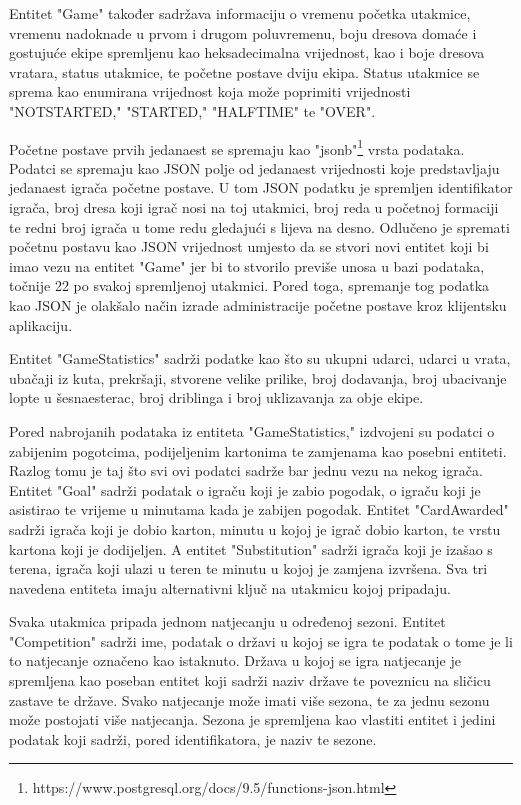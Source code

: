 \documentclass[times, utf8, zavrsni]{fer}
\begin{document}
%
Entitet "Game" također sadržava informaciju o vremenu početka utakmice, vremenu nadoknade u prvom i drugom poluvremenu, boju dresova domaće i gostujuće ekipe spremljenu kao heksadecimalna vrijednost,
kao i boje dresova vratara, status utakmice, te početne postave dviju ekipa.
Status utakmice se sprema kao enumirana vrijednost koja može poprimiti vrijednosti "NOT\textunderscore STARTED," "STARTED," "HALFTIME" te "OVER".

Početne postave prvih jedanaest se spremaju kao "jsonb"\footnote{https://www.postgresql.org/docs/9.5/functions-json.html} \citep{postgressjson} vrsta podataka.
Podatci se spremaju kao JSON polje od jedanaest vrijednosti koje predstavljaju jedanaest igrača početne postave.
U tom JSON podatku je spremljen identifikator igrača, broj dresa koji igrač nosi na toj utakmici, broj reda u početnoj formaciji te redni broj igrača u tome redu gledajući s lijeva na desno.
Odlučeno je spremati početnu postavu kao JSON vrijednost umjesto da se stvori novi entitet koji bi imao vezu na entitet "Game" jer bi to stvorilo previše unosa u bazi podataka, točnije 22 po svakoj spremljenoj utakmici.
Pored toga, spremanje tog podatka kao JSON je olakšalo način izrade administracije početne postave kroz klijentsku aplikaciju.

Entitet "GameStatistics" sadrži podatke kao što su ukupni udarci, udarci u vrata, ubačaji iz kuta, prekršaji, stvorene velike prilike, broj dodavanja, broj ubacivanje lopte u šesnaesterac, broj driblinga i broj uklizavanja za obje ekipe.

Pored nabrojanih podataka iz entiteta "GameStatistics," izdvojeni su podatci o zabijenim pogotcima, podijeljenim kartonima te zamjenama kao posebni entiteti.
Razlog tomu je taj što svi ovi podatci sadrže bar jednu vezu na nekog igrača.
Entitet "Goal" sadrži podatak o igraču koji je zabio pogodak, o igraču koji je asistirao te vrijeme u minutama kada je zabijen pogodak.
Entitet "CardAwarded" sadrži igrača koji je dobio karton, minutu u kojoj je igrač dobio karton, te vrstu kartona koji je dodijeljen.
A entitet "Substitution" sadrži igrača koji je izašao s terena, igrača koji ulazi u teren te minutu u kojoj je zamjena izvršena.
Sva tri navedena entiteta imaju alternativni ključ na utakmicu kojoj pripadaju.

Svaka utakmica pripada jednom natjecanju u određenoj sezoni.
Entitet "Competition" sadrži ime, podatak o državi u kojoj se igra te podatak o tome je li to natjecanje označeno kao istaknuto.
Država u kojoj se igra natjecanje je spremljena kao poseban entitet koji sadrži naziv države te poveznicu na sličicu zastave te države.
Svako natjecanje može imati više sezona, te za jednu sezonu može postojati više natjecanja.
Sezona je spremljena kao vlastiti entitet i jedini podatak koji sadrži, pored identifikatora, je naziv te sezone.
\end{document}
